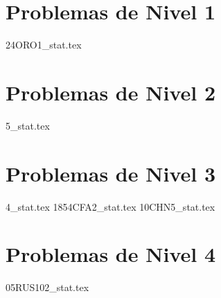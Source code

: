 \section{Problemas de Nivel 1}
{24ORO1_stat.tex} %

\section{Problemas de Nivel 2}
{5_stat.tex} %

\section{Problemas de Nivel 3}
{4_stat.tex} %
{1854CFA2_stat.tex} %
{10CHN5_stat.tex} %

\section{Problemas de Nivel 4}
{05RUS102_stat.tex} %